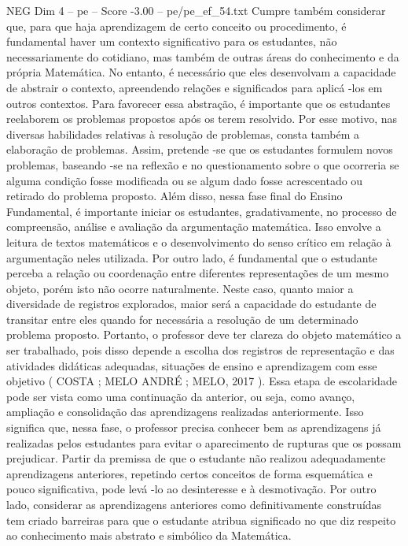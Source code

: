 \begin{textsample}{NEG Dim 4 – pe – Score -3.00 – pe/pe\_ef\_54.txt}
Cumpre também considerar que, para que haja aprendizagem de certo conceito ou procedimento, é fundamental haver um contexto significativo para os estudantes, não necessariamente do cotidiano, mas também de outras áreas do conhecimento e da própria Matemática.
No entanto, é necessário que eles desenvolvam a capacidade de abstrair o contexto, apreendendo relações e significados para aplicá -los em outros contextos.
Para favorecer essa abstração, é importante que os estudantes reelaborem os problemas propostos após os terem resolvido.
Por esse motivo, nas diversas habilidades relativas à resolução de problemas, consta também a elaboração de problemas.
Assim, pretende -se que os estudantes formulem novos problemas, baseando -se na reflexão e no questionamento sobre o que ocorreria se alguma condição fosse modificada ou se algum dado fosse acrescentado ou retirado do problema proposto.
Além disso, nessa fase final do Ensino Fundamental, é importante iniciar os estudantes, gradativamente, no processo de compreensão, análise e avaliação da argumentação matemática.
Isso envolve a leitura de textos matemáticos e o desenvolvimento do senso crítico em relação à argumentação neles utilizada.
Por outro lado, é fundamental que o estudante perceba a relação ou coordenação entre diferentes representações de um mesmo objeto, porém isto não ocorre naturalmente.
Neste caso, quanto maior a diversidade de registros explorados, maior será a capacidade do estudante de transitar entre eles quando for necessária a resolução de um determinado problema proposto.
Portanto, o professor deve ter clareza do objeto matemático a ser trabalhado, pois disso depende a escolha dos registros de representação e das atividades didáticas adequadas, situações de ensino e aprendizagem com esse objetivo ( COSTA ; MELO ANDRÉ ; MELO, 2017 ).
Essa etapa de escolaridade pode ser vista como uma continuação da anterior, ou seja, como avanço, ampliação e consolidação das aprendizagens realizadas anteriormente.
Isso significa que, nessa fase, o professor precisa conhecer bem as aprendizagens já realizadas pelos estudantes para evitar o aparecimento de rupturas que os possam prejudicar.
Partir da premissa de que o estudante não realizou adequadamente aprendizagens anteriores, repetindo certos conceitos de forma esquemática e pouco significativa, pode levá -lo ao desinteresse e à desmotivação.
Por outro lado, considerar as aprendizagens anteriores como definitivamente construídas tem criado barreiras para que o estudante atribua significado no que diz respeito ao conhecimento mais abstrato e simbólico da Matemática.

\end{textsample}
